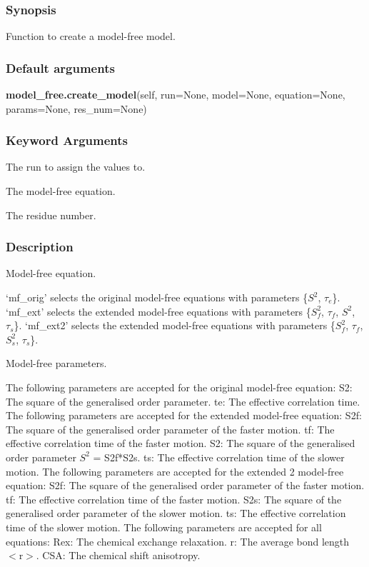 \subsubsection{Synopsis}

Function to create a model-free model.

\subsubsection{Default arguments}

\textsf{\textbf{model\_free.create\_model}(self, run=None, model=None, equation=None, params=None, res\_num=None)}


\subsubsection{Keyword Arguments}

  The run to assign the values to.

  The model-free equation.

  The residue number.

\subsubsection{Description}

Model-free equation.

`mf\_orig' selects the original model-free equations with parameters \{$S^2$, $\tau_e$\}.
`mf\_ext' selects the extended model-free equations with parameters \{$S^2_f$, $\tau_f$, $S^2$, $\tau_s$\}.
`mf\_ext2' selects the extended model-free equations with parameters \{$S^2_f$, $\tau_f$, $S^2_s$, $\tau_s$\}.


Model-free parameters.

The following parameters are accepted for the original model-free equation:
    S2:     The square of the generalised order parameter.
    te:     The effective correlation time.
The following parameters are accepted for the extended model-free equation:
    S2f:    The square of the generalised order parameter of the faster motion.
    tf:     The effective correlation time of the faster motion.
    S2:     The square of the generalised order parameter $S^2$ = S2f*S2s.
    ts:     The effective correlation time of the slower motion.
The following parameters are accepted for the extended 2 model-free equation:
    S2f:    The square of the generalised order parameter of the faster motion.
    tf:     The effective correlation time of the faster motion.
    S2s:    The square of the generalised order parameter of the slower motion.
    ts:     The effective correlation time of the slower motion.
The following parameters are accepted for all equations:
    Rex:    The chemical exchange relaxation.
    r:      The average bond length $<$r$>$.
    CSA:    The chemical shift anisotropy.


